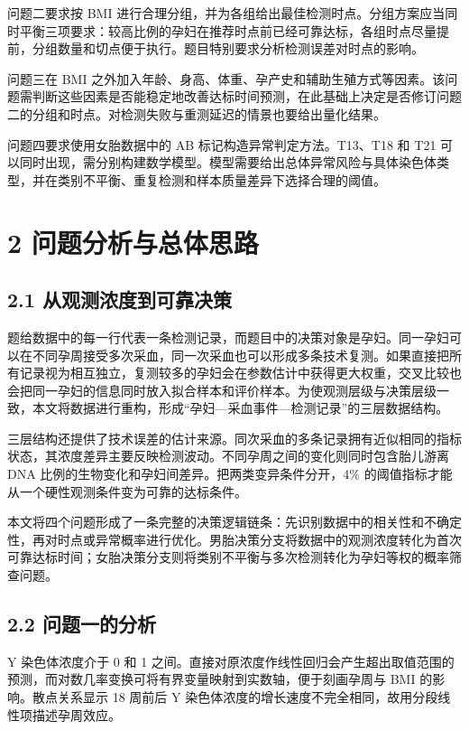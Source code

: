 \documentclass[UTF8,fontset=fandol,zihao=-4,a4paper]{ctexart}
\begin{document}
问题二要求按 BMI
进行合理分组，并为各组给出最佳检测时点。分组方案应当同时平衡三项要求：较高比例的孕妇在推荐时点前已经可靠达标，各组时点尽量提前，分组数量和切点便于执行。题目特别要求分析检测误差对时点的影响。

问题三在 BMI
之外加入年龄、身高、体重、孕产史和辅助生殖方式等因素。该问题需判断这些因素是否能稳定地改善达标时间预测，在此基础上决定是否修订问题二的分组和时点。对检测失败与重测延迟的情景也要给出量化结果。

问题四要求使用女胎数据中的 AB 标记构造异常判定方法。T13、T18 和 T21
可以同时出现，需分别构建数学模型。模型需要给出总体异常风险与具体染色体类型，并在类别不平衡、重复检测和样本质量差异下选择合理的阈值。

\section{2
问题分析与总体思路}\label{ux95eeux9898ux5206ux6790ux4e0eux603bux4f53ux601dux8def}

\subsection{2.1
从观测浓度到可靠决策}\label{ux4eceux89c2ux6d4bux6d53ux5ea6ux5230ux53efux9760ux51b3ux7b56}

题给数据中的每一行代表一条检测记录，而题目中的决策对象是孕妇。同一孕妇可以在不同孕周接受多次采血，同一次采血也可以形成多条技术复测。如果直接把所有记录视为相互独立，复测较多的孕妇会在参数估计中获得更大权重，交叉比较也会把同一孕妇的信息同时放入拟合样本和评价样本。为使观测层级与决策层级一致，本文将数据进行重构，形成``孕妇---采血事件---检测记录''的三层数据结构。

三层结构还提供了技术误差的估计来源。同次采血的多条记录拥有近似相同的指标状态，其浓度差异主要反映检测波动。不同孕周之间的变化则同时包含胎儿游离
DNA 比例的生物变化和孕妇间差异。把两类变异条件分开，4\%
的阈值指标才能从一个硬性观测条件变为可靠的达标条件。

本文将四个问题形成了一条完整的决策逻辑链条：先识别数据中的相关性和不确定性，再对时点或异常概率进行优化。男胎决策分支将数据中的观测浓度转化为首次可靠达标时间；女胎决策分支则将类别不平衡与多次检测转化为孕妇等权的概率筛查问题。

\subsection{2.2
问题一的分析}\label{ux95eeux9898ux4e00ux7684ux5206ux6790}

Y 染色体浓度介于 0 和 1
之间。直接对原浓度作线性回归会产生超出取值范围的预测，而对数几率变换可将有界变量映射到实数轴，便于刻画孕周与
BMI 的影响。散点关系显示 18
周前后 Y 染色体浓度的增长速度不完全相同，故用分段线性项描述孕周效应。
\end{document}
